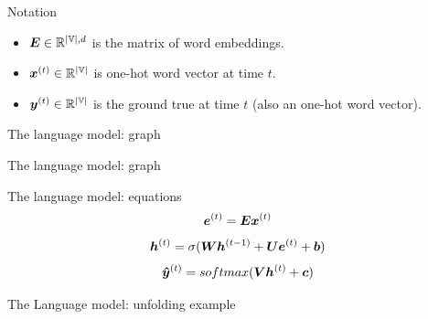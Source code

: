\documentclass[10pt]{beamer}
\begin{document}
\begin{frame}{Notation}
\begin{itemize}
\item $\bm{E} \in \mathbb{R}^{|\mathbb{V}|,d}$ is the matrix of word embeddings.
\vspace{0.3cm}
\item $\bm{x}^{(t)} \in \mathbb{R}^{|\mathbb{V}|}$ is one-hot word vector at time $t$.
\vspace{0.3cm}
\item $\bm{y}^{(t)} \in \mathbb{R}^{|\mathbb{V}|}$ is the ground true at time $t$ (also an one-hot word vector).
\end{itemize}
\end{frame}

\begin{frame}{The language model: graph}

\end{frame}

\begin{frame}{The language model: graph}

\end{frame}



\begin{frame}{The language model: equations}
\Large{
 \vspace{0.2cm}
\begin{equation*}
\bm{e}^{(t)} = \bm{E}\bm{x}^{(t)}
\end{equation*}
\vspace{0.2cm}
 \begin{equation*}
\bm{h}^{(t)} = \sigma(\bm{W}\bm{h}^{(t-1)}+ \bm{U}\bm{e}^{(t)}+ \bm{b})
\end{equation*}
\vspace{0.2cm}
\begin{equation*}
\bm{\hat{y}}^{(t)} = softmax(\bm{V}\bm{h}^{(t)} + \bm{c})
\end{equation*}
}
\end{frame}


\begin{frame}{The Language model: unfolding example}

\end{frame}
\end{document}
